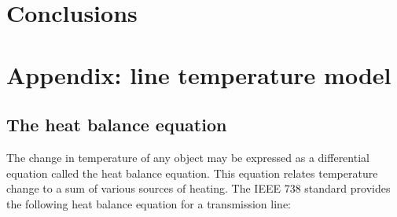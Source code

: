 \documentclass[conference]{IEEEtran}
\begin{document}
\section{Conclusions}


\section{Appendix: line temperature model}\label{sec:temp}

\subsection{The heat balance equation}

The change in temperature of any object may be expressed as a differential equation called the heat balance equation. This equation
relates temperature change to a sum of various sources of heating. The IEEE 738 standard \cite{ieee2013} provides the following heat balance equation for a transmission line:
\end{document}
